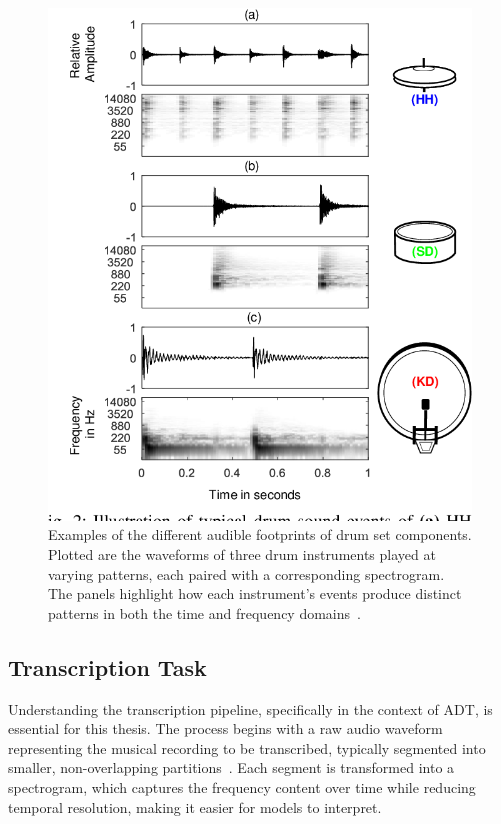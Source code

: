 \begin{figure}[H]
    \centering
    \includegraphics[scale=0.6, trim={0 1cm 0 0},clip]{figures/drumsettimbre}
    \caption{Examples of the different audible footprints of drum set components. Plotted are the waveforms of three drum instruments played at varying patterns, each paired with a corresponding spectrogram. The panels highlight how each instrument's events produce distinct patterns in both the time and frequency domains~\cite{8350302}.}
    \label{DrumsetTimbreFigure}
\end{figure}

\subsection{Transcription Task}

Understanding the transcription pipeline, specifically in the context of \gls{ADT}, is essential for this thesis. The process begins with a raw audio waveform representing the musical recording to be transcribed, typically segmented into smaller, non-overlapping partitions~\cite{vogl2018multiinstrumentdrumtranscription, gardner2022mt3multitaskmultitrackmusic}. Each segment is transformed into a spectrogram, which captures the frequency content over time while reducing temporal resolution, making it easier for models to interpret. 

